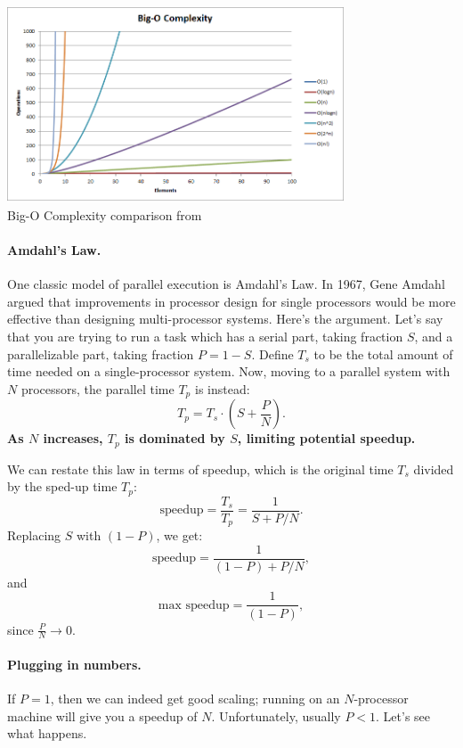 \documentclass[a4paper]{report}
\begin{document}
\begin{center}
	\includegraphics[width=0.75\textwidth]{images/big-o-complexity}\\
	Big-O Complexity comparison from ~\cite{bigocheatsheet}
\end{center}


\paragraph{Amdahl's Law.} One classic model of parallel execution
is Amdahl's Law. In 1967, Gene Amdahl argued that improvements in
processor design for single processors would be more effective than
designing multi-processor systems. Here's the argument. Let's say that
you are trying to run a task which has a serial part, taking fraction 
$S$, and a parallelizable part, taking fraction $P = 1-S$. Define $T_s$
to be the total 
amount of time needed on a single-processor system.
Now, moving to a parallel system with $N$ processors, the parallel
time $T_p$ is instead:
\[ T_p = T_s \cdot (S + \frac{P}{N}). \]
{\bf As $N$ increases, $T_p$ is dominated by $S$, limiting potential
speedup.}

We can restate this law in terms of speedup, which is the 
original time $T_s$ divided by the sped-up time $T_p$:
\[ \mbox{speedup} = \frac{T_s}{T_p} = \frac{1}{S+P/N}. \]
Replacing $S$ with $(1-P)$, we get:
\[ \mbox{speedup} = \frac{1}{(1-P)+P/N}, \]
and
\[ \mbox{max speedup} = \frac{1}{(1-P)}, \]
since $\frac{P}{N} \rightarrow 0$.

\paragraph{Plugging in numbers.} If $P = 1$, then we can indeed get good
scaling; running on an $N$-processor machine will give you a speedup
of $N$. Unfortunately, usually $P < 1$.  Let's see what happens.
\end{document}

